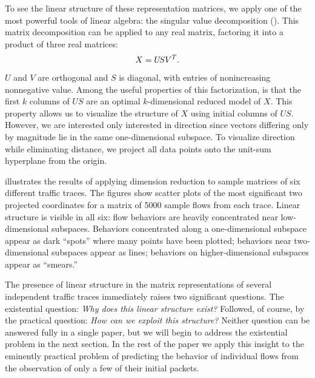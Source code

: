 \documentclass[conference]{IEEEtran}
\begin{document}

To see the linear structure of these representation matrices, we apply one of the most powerful tools of linear algebra:
the singular value decomposition ().
This matrix decomposition can be applied to any real matrix, factoring it into a product of three real matrices:
\begin{align}
  X = U\!S{V}^T.
\end{align}
$U$ and $V$ are orthogonal and $S$ is diagonal, with entries of nonincreasing nonnegative value.
Among the useful properties of this factorization, is that the first $k$ columns of $U\!S$ are an optimal $k$-dimensional reduced model of $X$.\svdnote
This property allows us to visualize the structure of $X$ using initial columns of $U\!S$.
However, we are interested only interested in direction since
vectors differing only by magnitude lie in the same one-dimensional subspace.
To visualize direction while eliminating distance, we project all data points onto the unit-sum hyperplane from the origin.\projectionnote

 illustrates the results of applying  dimension reduction to sample matrices of six different traffic traces.
The figures show scatter plots of the most significant two projected  coordinates for a matrix of 5000 sample flows from each trace.
Linear structure is visible in all six:
flow behaviors are heavily concentrated near low-dimensional subspaces.
Behaviors concentrated along a one-dimensional subspace appear as dark ``spots'' where many points have been plotted;
behaviors near two-dimensional subspaces appear as lines;
behaviors on higher-dimensional subspaces appear as ``smears.''

The presence of linear structure in the matrix representations of several independent traffic traces immediately raises two significant questions.
The existential question: \emph{Why does this linear structure exist?}
Followed, of course, by the practical question: \emph{How can we exploit this structure?}
Neither question can be answered fully in a single paper, but we will begin to address the existential problem in the next section.
In the rest of the paper we apply this insight to the eminently practical problem of predicting the behavior of individual flows from the observation of only a few of their initial packets.
\end{document}
